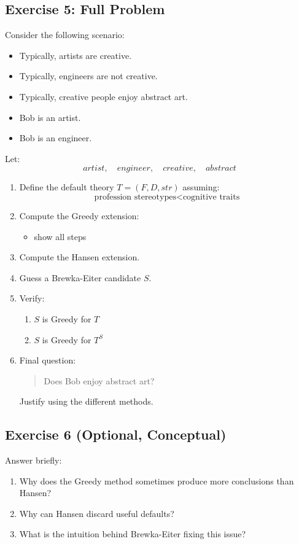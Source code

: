 \documentclass[11pt]{article}
\begin{document}
\subsection{Exercise 5: Full Problem}

Consider the following scenario:

\begin{itemize}
    \item Typically, artists are creative.
    \item Typically, engineers are not creative.
    \item Typically, creative people enjoy abstract art.
    \item Bob is an artist.
    \item Bob is an engineer.
\end{itemize}

Let:
\[
artist, \quad engineer, \quad creative, \quad abstract
\]

\begin{enumerate}
    \item Define the default theory $T = (F, D, str)$ assuming:
    \[
    \text{profession stereotypes} < \text{cognitive traits}
    \]

    \item Compute the Greedy extension:
    \begin{itemize}
        \item show all steps
    \end{itemize}

    \item Compute the Hansen extension.

    \item Guess a Brewka-Eiter candidate $S$.

    \item Verify:
    \begin{enumerate}
        \item $S$ is Greedy for $T$
        \item $S$ is Greedy for $T^S$
    \end{enumerate}

    \item Final question:
    \begin{quote}
        Does Bob enjoy abstract art?
    \end{quote}
    Justify using the different methods.
\end{enumerate}

\subsection{Exercise 6 (Optional, Conceptual)}

Answer briefly:

\begin{enumerate}
    \item Why does the Greedy method sometimes produce more conclusions than Hansen?

    \item Why can Hansen discard useful defaults?

    \item What is the intuition behind Brewka-Eiter fixing this issue?

\end{enumerate}
\end{document}
